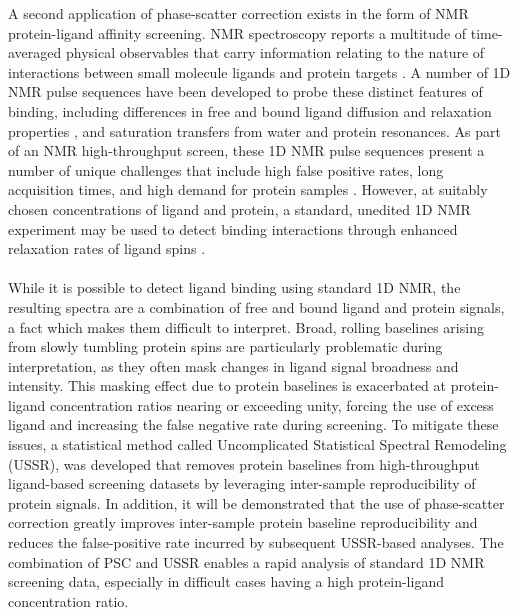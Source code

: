 \begin{doublespace}
A second application of phase-scatter correction exists in the form of NMR
protein-ligand affinity screening. NMR spectroscopy reports a multitude of
time-averaged physical observables that carry information relating to the
nature of interactions between small molecule ligands and protein targets
\cite{lepre:chemrev2004}. A number of 1D \hnmr{} NMR pulse sequences have
been developed to probe these distinct features of binding, including
differences in free and bound ligand diffusion and relaxation properties
\cite{hajduk:jacs1997}, and saturation transfers from water
\cite{dalvit:jbnmr2000} and protein \cite{mayer:jacs2001} resonances. As part
of an NMR high-throughput screen, these 1D \hnmr{} NMR pulse sequences present
a number of unique challenges that include high false positive rates, long
acquisition times, and high demand for protein samples
\cite{lepre:menz2011,harner:jbnmr2013}. However, at suitably chosen
concentrations of ligand and protein, a standard, unedited 1D \hnmr{} NMR
experiment may be used to detect binding interactions through enhanced
relaxation rates of ligand spins
\cite{mercier:jacs2006,powers:ddt2008,mercier:cchts2009}.
\\\\
While it is possible to detect ligand binding using standard 1D \hnmr{} NMR,
the resulting spectra are a combination of free and bound ligand and protein
signals, a fact which makes them difficult to interpret. Broad, rolling
baselines arising from slowly tumbling protein spins are particularly
problematic during interpretation, as they often mask changes in ligand signal
broadness and intensity. This masking effect due to protein baselines is
exacerbated at protein-ligand concentration ratios nearing or exceeding unity,
forcing the use of excess ligand and increasing the false negative rate during
screening. To mitigate these issues, a statistical method called Uncomplicated
Statistical Spectral Remodeling (USSR), was developed that removes protein
baselines from high-throughput ligand-based screening datasets by leveraging
inter-sample reproducibility of protein signals. In addition, it will be
demonstrated that the use of phase-scatter correction greatly improves
inter-sample protein baseline reproducibility and reduces the false-positive
rate incurred by subsequent USSR-based analyses. The combination of PSC and
USSR enables a rapid analysis of standard 1D \hnmr{} NMR screening data,
especially in difficult cases having a high protein-ligand concentration ratio.
\end{doublespace}

